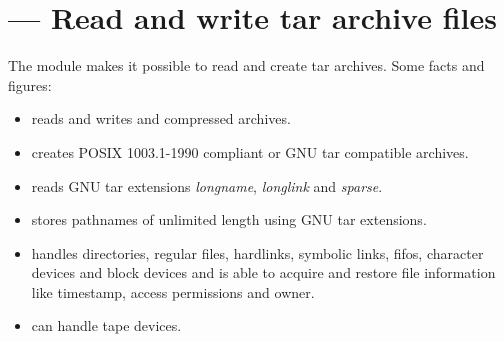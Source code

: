 \section{ --- Read and write tar archive files}



The  module makes it possible to read and create tar archives.
Some facts and figures:

\begin{itemize}
\item reads and writes  and  compressed archives.
\item creates POSIX 1003.1-1990 compliant or GNU tar compatible archives.
\item reads GNU tar extensions \emph{longname}, \emph{longlink} and
      \emph{sparse}.
\item stores pathnames of unlimited length using GNU tar extensions.
\item handles directories, regular files, hardlinks, symbolic links, fifos,
      character devices and block devices and is able to acquire and
      restore file information like timestamp, access permissions and owner.
\item can handle tape devices.
\end{itemize}

